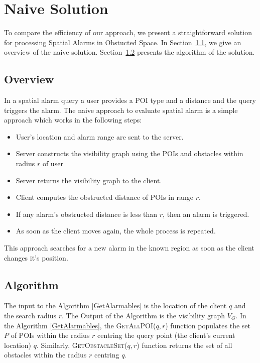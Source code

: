 \chapter{Naive Solution}
\label{chap:naivesoln}

To compare the efficiency of our approach, we present a straightforward solution for processing Spatial Alarms in Obstucted Space. 
In Section~\ref{naiveview}, we give an overview of the naive solution. Section~\ref{naivealgo} presents the algorithm of the solution.

\vspace*{12pt}

\section{Overview}
\label{naiveview}
In a spatial alarm query a user provides a POI type and a distance and the query triggers the alarm. The naive approach to evaluate spatial alarm is a simple approach which works in the following steps:
\begin{itemize}
\item User's location and alarm range are sent to the server.
\item Server constructs the visibility graph using the POIs and obstacles within radius $r$ of user
\item Server returns the visibility graph to the client.
\item Client computes the obstructed distance of POIs in range $r$.
\item If any alarm's obstructed distance is less than $r$, then an alarm is triggered.
\item As soon as the client moves again, the whole process is repeated.
\end{itemize} 
This approach searches for a new alarm in the known region as soon as the client changes it's position.


\vspace*{12pt}

\section{Algorithm}
\label{naivealgo}
The input to the Algorithm \ref{GetAlarmables} is the location of the client $q$ and the search radius $r$. The Output of the Algorithm is the visibility graph $V_G$.
In the Algorithm \ref{GetAlarmables}, the \textsc{GetAllPOI}($q, r$) function populates the set $P$ of POIs within the radius $r$ centring the query point (the client's current location) $q$. Similarly, \textsc{GetObstacleSet}($q, r$) function returns the set of all obstacles within the radius $r$ centring $q$.\\

